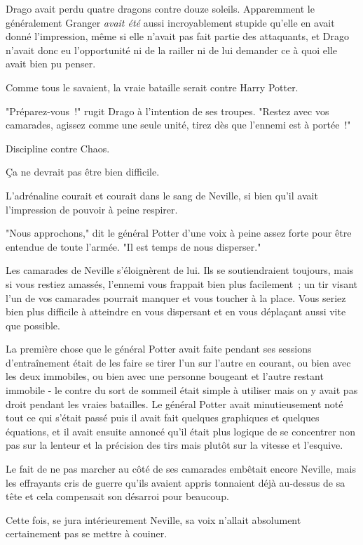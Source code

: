 Drago avait perdu quatre dragons contre douze soleils. Apparemment le généralement Granger \emph{avait été} aussi incroyablement stupide qu'elle en avait donné l'impression, même si elle n'avait pas fait partie des attaquants, et Drago n'avait donc eu l'opportunité ni de la railler ni de lui demander ce à quoi elle avait bien pu penser.

Comme tous le savaient, la vraie bataille serait contre Harry Potter.

"Préparez-vous~!" rugit Drago à l'intention de ses troupes. "Restez avec vos camarades, agissez comme une seule unité, tirez dès que l'ennemi est à portée~!"

Discipline contre Chaos.

Ça ne devrait pas être bien difficile.

\later

L'adrénaline courait et courait dans le sang de Neville, si bien qu'il avait l'impression de pouvoir à peine respirer.

"Nous approchons," dit le général Potter d'une voix à peine assez forte pour être entendue de toute l'armée. "Il est temps de nous disperser."

Les camarades de Neville s'éloignèrent de lui. Ils se soutiendraient toujours, mais si vous restiez amassés, l'ennemi vous frappait bien plus facilement~; un tir visant l'un de vos camarades pourrait manquer et vous toucher à la place. Vous seriez bien plus difficile à atteindre en vous dispersant et en vous déplaçant aussi vite que possible.

La première chose que le général Potter avait faite pendant ses sessions d'entraînement était de les faire se tirer l'un sur l'autre en courant, ou bien avec les deux immobiles, ou bien avec une personne bougeant et l'autre restant immobile - le contre du sort de sommeil était simple à utiliser mais on y avait pas droit pendant les vraies batailles. Le général Potter avait minutieusement noté tout ce qui s'était passé puis il avait fait quelques graphiques et quelques équations, et il avait ensuite annoncé qu'il était plus logique de se concentrer non pas sur la lenteur et la précision des tirs mais plutôt sur la vitesse et l'esquive.

Le fait de ne pas marcher au côté de ses camarades embêtait encore Neville, mais les effrayants cris de guerre qu'ils avaient appris tonnaient déjà au-dessus de sa tête et cela compensait son désarroi pour beaucoup.

Cette fois, se jura intérieurement Neville, sa voix n'allait absolument certainement pas se mettre à couiner.

